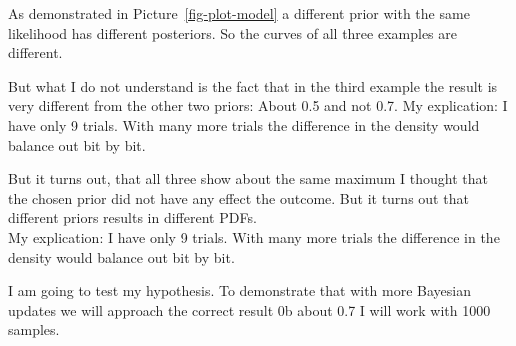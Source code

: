 \documentclass[
  letterpaper,
  DIV=11,
  numbers=noendperiod]{scrreprt}
\begin{document}
\begin{tcolorbox}[enhanced jigsaw, colframe=quarto-callout-caution-color-frame, colback=white, toprule=.15mm, breakable, arc=.35mm, bottomtitle=1mm, colbacktitle=quarto-callout-caution-color!10!white, toptitle=1mm, titlerule=0mm, title=\textcolor{quarto-callout-caution-color}{\faFire}\hspace{0.5em}{Puzzlement}, leftrule=.75mm, opacityback=0, rightrule=.15mm, opacitybacktitle=0.6, bottomrule=.15mm, left=2mm, coltitle=black]

As demonstrated in Picture~\ref{fig-plot-model} a different prior with
the same likelihood has different posteriors. So the curves of all three
examples are different.

But what I do not understand is the fact that in the third example the
result is very different from the other two priors: About 0.5 and not
0.7. My explication: I have only 9 trials. With many more trials the
difference in the density would balance out bit by bit.

But it turns out, that all three show about the same maximum I thought
that the chosen prior did not have any effect the outcome. But it turns
out that different priors results in different PDFs.\\
My explication: I have only 9 trials. With many more trials the
difference in the density would balance out bit by bit.

\end{tcolorbox}

I am going to test my hypothesis. To demonstrate that with more Bayesian
updates we will approach the correct result 0b about 0.7 I will work
with 1000 samples.
\end{document}
